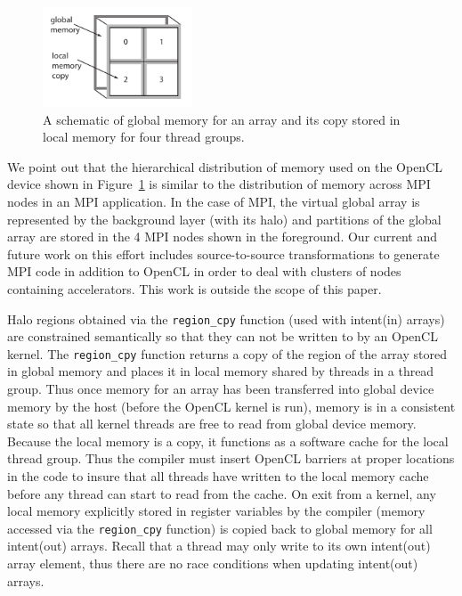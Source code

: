 \begin{figure}[!t]
\centering
\includegraphics[width=1.75in]{cl-memory.pdf}
\caption{A schematic of global memory for an array and its copy stored in local memory
for four thread groups.}
\label{fig:cl-memory}
\end{figure}

We point out that the hierarchical distribution of memory used on the OpenCL
device shown in Figure~\ref{fig:cl-memory} is similar to the distribution of
memory across MPI nodes in an MPI application.  In the case of MPI, the
virtual global array is represented by the background layer (with its halo) and
partitions of the global array are stored in the 4 MPI nodes shown in the foreground.
Our current and future work on this effort includes source-to-source transformations
to generate MPI code in addition to OpenCL in order to deal with clusters of 
nodes containing accelerators.  This work is outside the scope of this paper.

Halo regions obtained via the {\tt region\_cpy} function (used with intent(in)
arrays) are constrained semantically so that they can not be written to by an
OpenCL kernel.  The {\tt region\_cpy} function returns a copy of the region of
the array stored in global memory and places it in local memory shared by
threads in a thread group.  Thus once memory for an array has been transferred
into global device memory by the host (before the OpenCL kernel is run), memory
is in a consistent state so that all kernel threads are free to read from global
device memory.  Because the local memory is a copy, it functions as a software
cache for the local thread group.  Thus the compiler must insert OpenCL barriers
at proper locations in the code to insure that all threads have written to the
local memory cache before any thread can start to read from the cache.  On exit
from a kernel, any local memory explicitly stored in register variables by the
compiler (memory accessed via the {\tt region\_cpy} function) is copied back to
global memory for all intent(out) arrays.  Recall that a thread may only write to
its own intent(out) array element, thus there are no race conditions when updating
intent(out) arrays.

